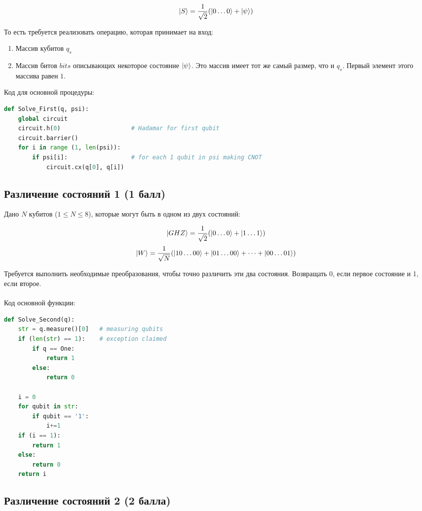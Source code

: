 \documentclass{article}
\begin{document}
$$\Ket{S} = \frac{1}{\sqrt2}(\Ket{0\dots0} +\Ket{\psi})$$

То есть требуется реализовать операцию, которая принимает на вход:

\begin{enumerate}
    \item Массив кубитов $q_s$
    \item Массив битов $bits$ описывающих некоторое состояние $\Ket{\psi}$. Это массив имеет тот же самый размер, что и $q_s$. Первый элемент этого массива равен $1$.
\end{enumerate}
Код для основной процедуры:
\begin{lstlisting}[language=Python]
def Solve_First(q, psi):
    global circuit
    circuit.h(0)                    # Hadamar for first qubit
    circuit.barrier()
    for i in range (1, len(psi)):
        if psi[i]:                  # for each 1 qubit in psi making CNOT
            circuit.cx(q[0], q[i])
\end{lstlisting}


\subsection{Различение состояний 1 (1 балл)}

Дано $N$ кубитов ($1 \le N \le 8$), которые могут быть в одном из двух состояний:

$$\Ket{GHZ} = \frac{1}{\sqrt2}(\Ket{0\dots0} +\Ket{1\dots1})$$
$$\Ket{W} = \frac{1}{\sqrt N}(\Ket{10\dots00}+\Ket{01\dots00} + \dots +\Ket{00\dots01})$$

Требуется выполнить необходимые преобразования, чтобы точно различить эти два состояния. Возвращать $0$, если первое состояние и 1, если второе. 
\\\\
Код основной функции:
\begin{lstlisting}[language=Python]
def Solve_Second(q):
    str = q.measure()[0]   # measuring qubits 
    if (len(str) == 1):    # exception claimed
        if q == One:
            return 1
        else:
            return 0
    
    i = 0
    for qubit in str:
        if qubit == '1':
            i+=1
    if (i == 1):
        return 1
    else:
        return 0
    return i
\end{lstlisting}


\subsection{Различение состояний 2 (2 балла)}
\end{document}
